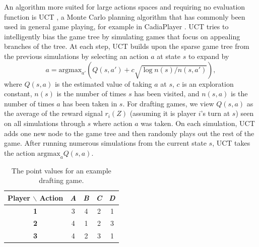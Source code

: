 \documentclass[letterpaper]{article}
\numberwithin{equation}{section}
\numberwithin{theorem}{section}
\numberwithin{lemma}{section}
\numberwithin{df}{section}
\begin{document}
An algorithm more suited for large actions spaces and requiring no evaluation function is UCT \cite{UCT}, a Monte Carlo planning algorithm that has commonly been used in general game playing, for example in CadiaPlayer \cite{Cadia}.  UCT tries to intelligently bias the game tree by simulating games that focus on appealing branches of the tree.  At each step, UCT builds upon the sparse game tree from the previous simulations by selecting an action $a$ at state $s$ to expand by
\[ a = \text{argmax}_{a'} \left( Q(s,a') + c \sqrt{ \log n(s) / n(s,a') } \right), \]
where $Q(s,a)$ is the estimated value of taking $a$ at $s$, $c$ is an exploration constant, $n(s)$ is the number of times $s$ has been visited, and $n(s,a)$ is the number of times $a$ has been taken in $s$.  For drafting games, we view $Q(s,a)$ as the average of the reward signal $r_i(Z)$ (assuming it is player $i$'s turn at $s$) seen on all simulations through $s$ where action $a$ was taken.  On each simulation, UCT adds one new node to the game tree and then randomly plays out the rest of the game.  %
After running numerous simulations from the current state $s$, UCT takes the action $\text{argmax}_{a}Q(s,a)$.

\begin{table}[t]
	\centering
		\caption{The point values for an example drafting game.}
		\label{tab:KthEx}
		\begin{footnotesize}
		\begin{tabular}{|c|c|c|c|c|}
			\hline
			\bf Player $\backslash$ Action & \bfseries {\em A} & \bfseries {\em B} & \bfseries {\em C} & \bfseries {\em D} \\
			\hline
			\bf 1 & 3 & 4 & 2 & 1 \\
			\hline
			\bf 2 & 4 & 1 & 2 & 3 \\
			\hline
			\bf 3 & 4 & 2 & 3 & 1 \\
			\hline
		\end{tabular}
		\end{footnotesize}
\end{table}
\end{document}
